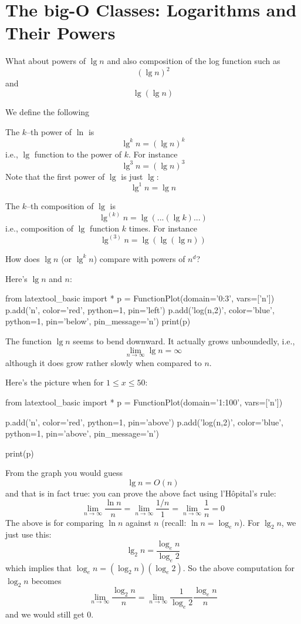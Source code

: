 \section{The big-O Classes: Logarithms and Their Powers}

What about powers of $\lg n$ and also composition of the log function
such as
\[
(\lg n)^2
\]
and
\[
\lg (\lg n)
\]

We define the following
\begin{itemize}

\li The $k$--th power of $\ln$ is
\[
\lg^k n = (\lg n)^k
\]
i.e., $\lg$ function to the power of $k$.
For instance
\[
\lg^3 n = (\lg n)^3
\]
Note that the first power of $\lg$ is just $\lg$:
\[
\lg^1 n = \lg n
\]

\li The $k$--th composition of $\lg$ is
\[
\lg^{(k)} n = \lg(...(\lg k)...)
\]
i.e., composition of $\lg$ function $k$ times.
For instance 
\[
\lg^{(3)} n = \lg(\lg(\lg n))
\]

\end{itemize}

How does $\lg n$ (or $\lg^k n$) compare with powers of $n^d$?

Here's $\lg n$ and $n$:

\begin{python}
from latextool_basic import *
p = FunctionPlot(domain='0:3', vars=['n'])
p.add('n', color='red', python=1, pin='left')
p.add('log(n,2)', color='blue', python=1, pin='below', pin_message='\lg n')
print(p)
\end{python}

The function $\lg n$ seems to bend downward.
It actually grows unboundedly,
i.e., 
\[
\lim_{n \rightarrow \infty} \lg n = \infty
\]
although it does grow rather slowly when compared to $n$.

Here's the picture when for $1 \leq x \leq 50$:
\begin{python}
from latextool_basic import *
p = FunctionPlot(domain='1:100', vars=['n'])

p.add('n', color='red', python=1, pin='above')
p.add('log(n,2)', color='blue', python=1, pin='above', pin_message='\lg n')

print(p)
\end{python}

From the graph you would guess
\[
\lg n = O(n)
\]
and that is in fact true: you can prove the above fact using l'H\^opital's 
rule:
\[
\lim_{n \rightarrow \infty} \frac{\ln n}{n}
= \lim_{n \rightarrow \infty} \frac{1/n}{1}
= \lim_{n \rightarrow \infty} \frac{1}{n}
= 0
\]
The above is for comparing $\ln n$ against $n$ (recall: $\ln n = \log_e n$).
For $\lg_2 n$, we just use this:
\[
\lg_2 n = \frac{\log_e n}{\log_e 2}
\]
which implies that $\log_e n = (\log_2 n)(\log_e 2)$.
So the above computation for $\log_2 n$ becomes
\[
\lim_{n \rightarrow \infty} \frac{\log_2 n}{n}
= \lim_{n \rightarrow \infty} \frac{1}{\log_e 2}\frac{\log_e n}{n}
\]
and we would still get $0$.

